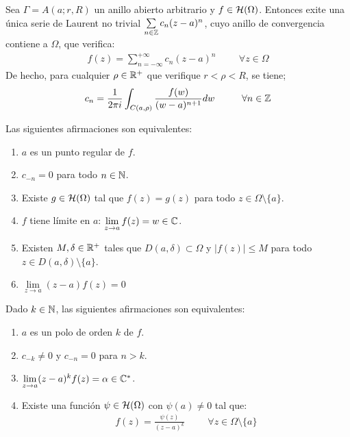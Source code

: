 \documentclass[12pt]{article}
\begin{document}
    \begin{teo} Sea $\Gamma = A(a;r,R)$ un anillo abierto arbitrario y $f\in \mathcal{H}(\Omega)$. Entonces exite una única serie de Laurent no trivial $\sum\limits_{n \in \mathbb{Z}}c_n(z-a)^n$, cuyo anillo de convergencia contiene a $\Omega$, que verifica:
    \begin{gather*}
        f(z) = \sum\limits_{n=-\infty}^{+\infty} c_n(z-a)^n \hspace{1cm} \forall z \in \Omega
    \end{gather*}
    De hecho, para cualquier $\rho\in \mathbb{R}^+$ que verifique $r < \rho < R$, se tiene;
    \begin{gather*}
        c_n = \frac{1}{2\pi i} \int_{C(a, \rho)} \frac{f(w)}{(w-a)^{n+1}}dw \hspace{1cm} \forall n \in \mathbb{Z}
    \end{gather*}
    \end{teo}

    \begin{prop}
        Las siguientes afirmaciones son equivalentes:
        \begin{enumerate}
            \item $a$ es un punto regular de $f$.
            \item $c_{-n} = 0 $ para todo $n\in \mathbb{N}$.
            \item Existe $g\in \mathcal{H}(\Omega)$ tal que $f(z) = g(z)$ para todo $z \in \Omega \setminus \{a\}$.
            \item $f$ tiene límite en $a$: $\lim\limits_{z\to a } f(z) = w \in \mathbb{C}$.
            \item Existen $M,\delta\in \mathbb{R}^+$ tales que $D(a, \delta) \subset \Omega$ y $|f(z)|\leq M$ para todo $z\in D(a,\delta)\setminus \{a\}$.
            \item $\lim\limits_{z\to a} (z-a)f(z) = 0$
        \end{enumerate}
    \end{prop}

    \begin{prop} Dado $k \in \mathbb{N}$, las siguientes afirmaciones son equivalentes:
        \begin{enumerate}
            \item $a$ es un polo de orden $k$ de $f$.
            \item $c_{-k}\neq 0$ y $c_{-n} = 0$ para $n> k$.
            \item $\lim\limits_{z \to a}(z-a)^kf(z) = \alpha \in \mathbb{C}^*$.
            \item Existe una función $\psi\in \mathcal{H}(\Omega)$ con $\psi(a) \neq 0$ tal que:
            \begin{gather*}
                f(z) = \frac{\psi(z)}{(z-a)^k} \hspace{1cm} \forall z \in \Omega \setminus \{a\}
            \end{gather*}
        \end{enumerate}
    \end{prop}
\end{document}
